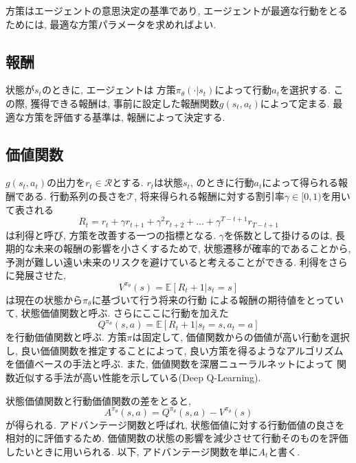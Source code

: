 \documentclass[../main]{subfiles}
\begin{document}
方策はエージェントの意思決定の基準であり, 
エージェントが最適な行動をとるためには, 
最適な方策パラメータを求めればよい.

\subsection{報酬}
状態が$s_t$のときに, エージェントは
方策$\pi_\theta(\cdot|s_t)$によって行動$a_t$を選択する.
この際, 獲得できる報酬は, 
事前に設定した報酬関数$g(s_t, a_t)$によって定まる. 
最適な方策を評価する基準は, 報酬によって決定する.

\subsection{価値関数}
$g(s_t, a_t)$の出力を$r_t \in \mathcal{R}$とする.
$r_t$は状態$s_t$, のときに行動$a_t$によって得られる報酬である.
行動系列の長さを$\mathcal{T}$, 
将来得られる報酬に対する割引率$\gamma \in [0, 1)$を用いて表される
\begin{equation}
R_t = r_t + \gamma r_{t+1} + \gamma^2 r_{t+2} 
+ ... + \gamma^{T-t+1} r_{T-t+1}
\end{equation}
は利得と呼び, 方策を改善する一つの指標となる.
$\gamma$を係数として掛けるのは, 
長期的な未来の報酬の影響を小さくするためで, 
状態遷移が確率的であることから, 
予測が難しい遠い未来のリスクを避けていると考えることができる.
利得をさらに発展させた, 
\begin{equation}
V^{\pi_\theta}(s) = \mathbb{E}[R_t+1|s_t=s]
\end{equation}
は現在の状態から$\pi_\theta$に基づいて行う将来の行動
による報酬の期待値をとっていて, 状態価値関数と呼ぶ.
さらにここに行動を加えた
\begin{equation}
Q^{\pi_\theta}(s, a) = \mathbb{E}[R_t+1|s_t=s, a_t=a]
\end{equation}
を行動価値関数と呼ぶ.
方策$\pi$は固定して, 
価値関数からの価値が高い行動を選択し, 
良い価値関数を推定することによって, 
良い方策を得るようなアルゴリズムを価値ベースの手法と呼ぶ.
また, 価値関数を深層ニューラルネットによって
関数近似する手法が高い性能を示している(Deep Q-Learning).

状態価値関数と行動価値関数の差をとると,
\begin{equation}
A^{\pi_\theta}(s, a) = 
Q^{\pi_\theta}(s, a) - V^{\pi_\theta}(s)
\end{equation}
が得られる. アドバンテージ関数と呼ばれ, 
状態価値に対する行動価値の良さを相対的に評価するため.
価値関数の状態の影響を減少させて行動そのものを評価したいときに用いられる.
以下, アドバンテージ関数を単に$A_t$と書く.
\end{document}

